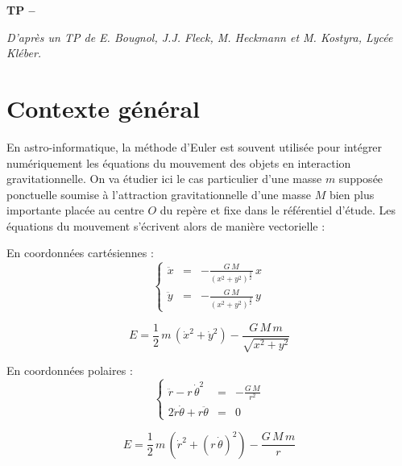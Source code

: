 

%



\begin{center}
{\Large\bf TP \no {\numero} -- \descrip}
\end{center}

\begin{small}\textit{D'après un TP de E. Bougnol, J.J. Fleck, M. Heckmann et M. Kostyra, Lycée Kléber.}\end{small}
 
\section*{Contexte général}

En astro-informatique, la méthode d’Euler est souvent utilisée pour intégrer numériquement les équations du mouvement des objets en interaction gravitationnelle. On va étudier ici le cas particulier d’une masse $m$ supposée ponctuelle soumise à l’attraction gravitationnelle d’une masse $M$ bien plus importante placée au centre $O$ du repère et fixe dans le référentiel d'étude. Les équations du mouvement s’écrivent alors de manière vectorielle :


\begin{multicols}{2}
En coordonnées cartésiennes :
\begin{displaymath}
\left\{ \begin{array}{lll}
\ddot{x} & = & \displaystyle - \frac{G\,M}{\left(x^2+y^2\right)^{\frac{3}{2}}}\,x  \\
\ddot{y} & = & \displaystyle - \frac{G\,M}{\left(x^2+y^2\right)^{\frac{3}{2}}}\,y 
\end{array} \right.
\end{displaymath}

$$E = \frac{1}{2}\,m\,(\dot{x}^2+\dot{y}^2)- \frac{G\,M\,m}{\sqrt{x^2+y^2}}$$

    \columnbreak
En coordonnées polaires :
\begin{displaymath}
\left\{ \begin{array}{lll}
\ddot{r}-r\,\dot{\theta}^2 & = & \displaystyle - \frac{G\,M}{r^2} \\
2\dot{r}\dot{\theta}+r\ddot{\theta} & = & 0 
\end{array} \right.
\end{displaymath}

$$E = \frac{1}{2}\,m\,(\dot{r}^2+(r\,\dot{\theta})^2)- \frac{G\,M\,m}{r}$$

\end{multicols}

